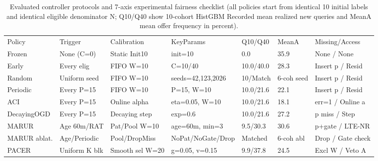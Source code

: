 \begin{table}[!ht]
\centering\footnotesize\setlength{\tabcolsep}{3.5pt}
\caption{Evaluated controller protocols and 7-axis experimental fairness checklist (all policies start from identical 10 initial labels and identical eligible denominator N; Q10/Q40 show 10-cohort HistGBM Recorded mean realized new queries and MeanA mean offer frequency in percent).}
\begin{tabular}{lllllll}
\hline
Policy & Trigger & Calibration & KeyParams & Q10/Q40 & MeanA & Missing/Access \\
Frozen & None (C=0) & Static Init10 & init=10 & 0.0 & 35.9 & None / None \\
Early & Every elig & FIFO W=10 & C=10/40 & 10.0/40.0 & 28.3 & Insert p / Resid \\
Random & Uniform seed & FIFO W=10 & seeds=42,123,2026 & 10/Match & 6-coh seed & Insert p / Resid \\
Periodic & Every P=15 & FIFO W=10 & P=15, W=10 & 10.0/21.6 & 22.1 & Insert p / Resid \\
ACI & Every P=15 & Online alpha & eta=0.05, W=10 & 10.0/21.6 & 18.1 & err=1 / Online a \\
DecayingOGD & Every P=15 & Decaying step & exp=0.6 & 10.0/21.6 & 27.2 & p miss / Step \\
MARUR & Age 60m/RAT & Pat/Pool W=10 & age=60m, min=3 & 9.5/30.3 & 30.6 & p+gate / LTE-NR \\
MARUR ablat. & Age/Periodic & Pool/DropMiss & NoPat/NoGate/Drop & Matched & 6-coh abl & Drop / Gate check \\
PACER & Uniform K blk & Smooth sel W=20 & g=0.05, v=0.15 & 9.9/37.8 & 24.5 & Excl W / Veto A \\
\hline
\end{tabular}
\end{table}
